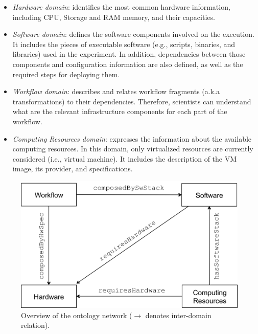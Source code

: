 \begin{itemize}
	\setlength{\itemsep}{1pt}
    \setlength{\parskip}{0pt}
    \setlength{\parsep}{0pt}

	\item{\emph{Hardware domain}}: identifies the most common hardware information, 
		including CPU, Storage and RAM memory, and their capacities.
	
    \item{\emph{Software domain}}: defines the software components involved on the execution. 
    	It includes the pieces of executable software (e.g., scripts, binaries, and libraries) used in 
	the experiment. In addition, dependencies between those components and configuration 
	information are also defined, as well as the required steps for deploying them.
	
    \item{\emph{Workflow domain}}: describes and relates workflow fragments (a.k.a transformations) 
    	to their dependencies. Therefore, scientists can understand what are the relevant infrastructure 
	components for each part of the workflow.
	
    \item{\emph{Computing Resources domain}}: expresses the information about the available 
    	computing resources. In this domain, only virtualized resources are currently considered 
	(i.e., virtual machine). It includes the description of the VM image, its provider, and specifications.
\end{itemize}

\begin{figure}[!htb]
	\centering
    \includegraphics[width=.9\linewidth]{figures/wicusrels}
    \caption{Overview of the ontology network ($\rightarrow$ denotes inter-domain relation).}
    \label{fig:wicusrels}
\end{figure}
